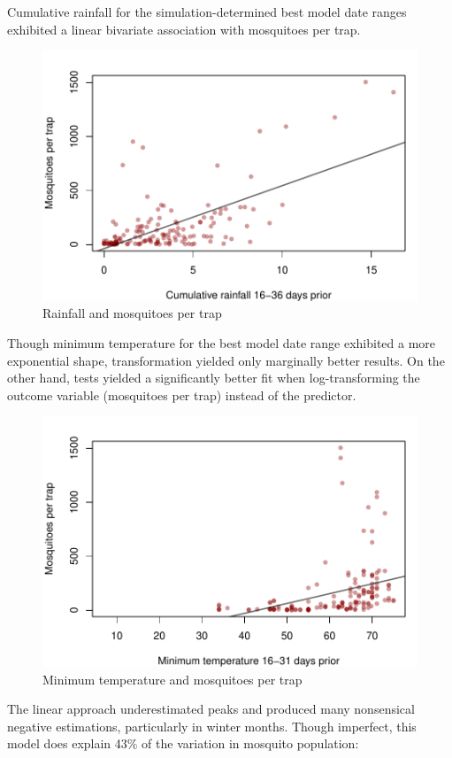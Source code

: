 \documentclass{article}
\begin{document}
\begin{multicols}{2}
Cumulative rainfall for the simulation-determined best model date ranges exhibited a linear bivariate association with mosquitoes per trap.
\begin{figure}[H]
\begin{center}  
\includegraphics{mosquitoRainTempArticle-006}
\caption{Rainfall and mosquitoes per trap}
\end{center}
\end{figure}

Though minimum temperature for the best model date range exhibited a more exponential shape, transformation yielded only marginally better results. On the other hand, tests yielded a significantly better fit when log-transforming the outcome variable (mosquitoes per trap) instead of the predictor. 

\vfill
\columnbreak

\begin{figure}[H]
\begin{center}  
\includegraphics{mosquitoRainTempArticle-007}
\caption{Minimum temperature and mosquitoes per trap}
\end{center}
\end{figure}


The linear approach underestimated peaks and produced many nonsensical negative estimations, particularly in winter months.  Though imperfect, this model does explain 43\% of the variation in mosquito population:

\end{multicols}
\end{document}
